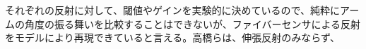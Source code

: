 それぞれの反射に対して、閾値やゲインを実験的に決めているので、純粋にアームの角度の振る舞いを比較することはできないが、ファイバーセンサによる反射をモデルにより再現できていると言える。高橋らは、伸張反射のみならず、









